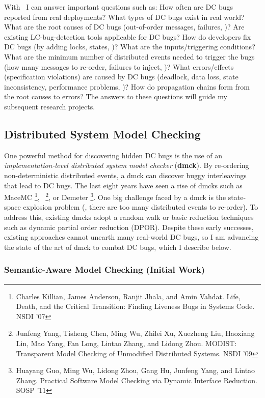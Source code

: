 \documentclass[11pt]{article}
\begin{document}
With \taxdc\, I can answer important questions such as: How often are DC bugs 
reported from real deployments? What types of DC bugs exist in real world?
What are the root causes of DC bugs (out-of-order messages, failures, \etc)?
Are existing LC-bug-detection tools applicable for DC bugs? How do developers
fix DC bugs (by adding locks, states, \etc)? What are the inputs/triggering
conditions?  What are the minimum number of distributed events needed to
trigger the bugs (how many messages to re-order, failures to inject, \etc)?
What errors/effects (specification violations) are caused by DC bugs (deadlock,
data loss, state inconsistency, performance problems, \etc)? How do propagation
chains form from the root causes to errors? The answers to these questions will
guide my subsequent research projects.

\subsection{Distributed System Model Checking}

One powerful method for discovering hidden DC bugs is the use of an
\textit{implementation-level distributed system model checker} (\textbf{dmck}).
By re-ordering non-deterministic distributed events, a dmck can discover buggy
interleavings that lead to DC bugs. The last eight years have seen a rise of
dmcks such as MaceMC \footnote{Charles Killian, James Anderson, Ranjit Jhala,
and Amin Vahdat. Life, Death, and the Critical Transition: Finding Liveness Bugs
in Systems Code. NSDI '07}, \modist\ \footnote{Junfeng Yang, Tisheng Chen, Ming
Wu, Zhilei Xu, Xuezheng Liu, Haoxiang Lin, Mao Yang, Fan Long, Lintao Zhang, and
Lidong Zhou. MODIST: Transparent Model Checking of Unmodified Distributed
Systems. NSDI '09}, or Demeter \footnote{Huayang Guo, Ming Wu, Lidong Zhou, Gang
Hu, Junfeng Yang, and Lintao Zhang. Practical Software Model Checking via
Dynamic Interface Reduction. SOSP '11}. One big challenge faced by a dmck is the
state-space explosion problem (\ie, there are too many distributed events to
re-order). To address this, existing dmcks adopt a random walk or basic
reduction techniques such as dynamic partial order reduction (DPOR). Despite
these early successes, existing approaches cannot unearth many real-world DC
bugs, so I am advancing the state of the art of dmck to combat DC bugs, which I
describe below.

\subsubsection*{Semantic-Aware Model Checking (Initial Work)} 
\end{document}
